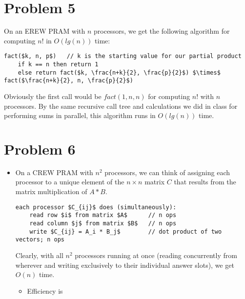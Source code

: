 \documentclass{article}
\providecommand{\prob}[1]{\section*{Problem #1}}
\begin{document}
  
\prob{5}
On an EREW PRAM with $n$ processors, we get the following algorithm for computing $n!$ in $O(lg(n))$ time:\\
\begin{lstlisting}
fact($k, n, p$)   // k is the starting value for our partial product
    if k == n then return 1
    else return fact($k, \frac{n+k}{2}, \frac{p}{2}$) $\times$ fact($\frac{n+k}{2}, n, \frac{p}{2}$)
\end{lstlisting}
Obviously the first call would be $fact(1, n, n)$ for computing $n!$ with $n$ processors. By the same recursive call tree and calculations we did in class for performing sums in parallel, this algorithm runs in $O(lg(n))$ time.

\prob{6}
\begin{itemize}
    \item On a CREW PRAM with $n^2$ processors, we can think of assigning each processor to a unique element of the $n \times n$ matrix $C$ that results from the matrix multiplication of $A*B$.
    \begin{lstlisting}
each processor $C_{ij}$ does (simultaneously):
    read row $i$ from matrix $A$      // n ops
    read column $j$ from matrix $B$   // n ops
    write $C_{ij} = A_i * B_j$        // dot product of two vectors; n ops
  \end{lstlisting}
  Clearly, with all $n^2$ processors running at once (reading concurrently from wherever and writing exclusively to their individual answer slots), we get $O(n)$ time.
  \begin{itemize}
    \item Efficiency is
  \end{itemize}
\end{itemize}
\end{document}
